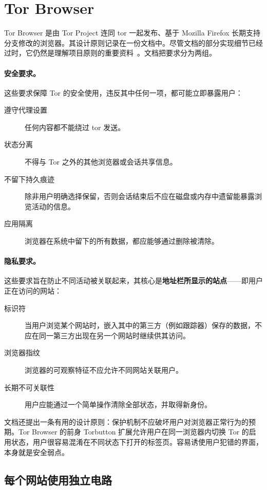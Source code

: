 \section{Tor Browser}\label{sec:browser-tb}

Tor Browser 是由 Tor Project 连同 tor 一起发布、基于 Mozilla Firefox 长期支持分支修改的浏览器。其设计原则记录在一份文档中。尽管文档的部分实现细节已经过时，它仍然是理解项目原则的重要资料~\cite{perry2018torbrowser}。文档把要求分为两组。

\paragraph{安全要求。}这些要求保障 Tor 的安全使用，违反其中任何一项，都可能立即暴露用户：
\begin{description}
  \item[遵守代理设置] 任何内容都不能绕过 tor 发送。
  \item[状态分离] 不得与 Tor 之外的其他浏览器或会话共享信息。
  \item[不留下持久痕迹] 除非用户明确选择保留，否则会话结束后不应在磁盘或内存中遗留能暴露浏览活动的信息。
  \item[应用隔离] 浏览器在系统中留下的所有数据，都应能够通过删除被清除。
\end{description}

\paragraph{隐私要求。}这些要求旨在防止不同活动被关联起来，其核心是\textbf{地址栏所显示的站点}——即用户正在访问的网站：
\begin{description}
  \item[标识符] 当用户浏览某个网站时，嵌入其中的第三方（例如跟踪器）保存的数据，不应在同一第三方出现在另一个网站时继续供其访问。
  \item[浏览器指纹] 浏览器的可观察特征不应允许不同网站关联用户。
  \item[长期不可关联性] 用户应能通过一个简单操作清除全部状态，并取得新身份。
\end{description}
文档还提出一条有用的设计原则：保护机制不应破坏用户对浏览器正常行为的预期。Tor Browser 的前身 Torbutton 扩展允许用户在同一浏览器内切换 Tor 的启用状态，用户很容易混淆在不同状态下打开的标签页。容易诱使用户犯错的界面，本身就是安全弱点。

\subsection{每个网站使用独立电路}

